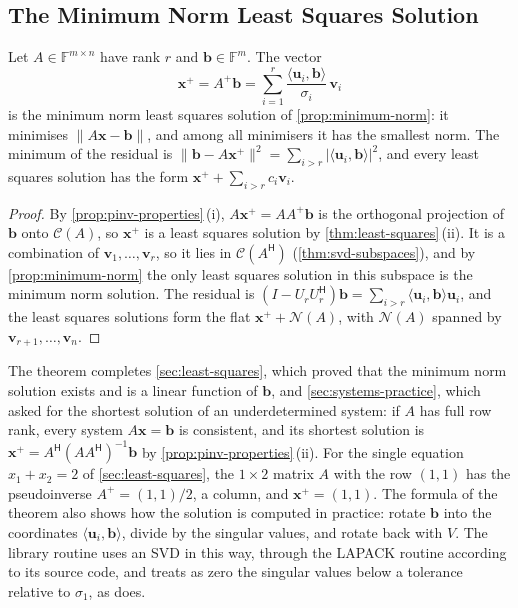 \subsection{The Minimum Norm Least Squares Solution}

\begin{theorem}
\label{thm:pinv-least-squares}
Let $A\in\mathbb F^{m\times n}$ have rank $r$ and $\mathbf b\in\mathbb F^m$. The vector
\[
\mathbf x^+=A^+\mathbf b=\sum_{i=1}^r\frac{\langle\mathbf u_i,\mathbf b\rangle}{\sigma_i}\,\mathbf v_i
\]
is the minimum norm least squares solution of \cref{prop:minimum-norm}: it minimises $\|A\mathbf x-\mathbf b\|$, and among all minimisers it has the smallest norm. The minimum of the residual is $\|\mathbf b-A\mathbf x^+\|^2=\sum_{i>r}|\langle\mathbf u_i,\mathbf b\rangle|^2$, and every least squares solution has the form $\mathbf x^++\sum_{i>r}c_i\mathbf v_i$.
\end{theorem}

\begin{proof}
By \cref{prop:pinv-properties}\,(i), $A\mathbf x^+=AA^+\mathbf b$ is the orthogonal projection of $\mathbf b$ onto $\mathcal C(A)$, so $\mathbf x^+$ is a least squares solution by \cref{thm:least-squares}\,(ii). It is a combination of $\mathbf v_1,\ldots,\mathbf v_r$, so it lies in $\mathcal C(A^{\mathsf H})$ (\cref{thm:svd-subspaces}), and by \cref{prop:minimum-norm} the only least squares solution in this subspace is the minimum norm solution. The residual is $(I-U_rU_r^{\mathsf H})\mathbf b=\sum_{i>r}\langle\mathbf u_i,\mathbf b\rangle\mathbf u_i$, and the least squares solutions form the flat $\mathbf x^++\mathcal N(A)$, with $\mathcal N(A)$ spanned by $\mathbf v_{r+1},\ldots,\mathbf v_n$.
\end{proof}

The theorem completes \cref{sec:least-squares}, which proved that the minimum norm solution exists and is a linear function of $\mathbf b$, and \cref{sec:systems-practice}, which asked for the shortest solution of an underdetermined system: if $A$ has full row rank, every system $A\mathbf x=\mathbf b$ is consistent, and its shortest solution is $\mathbf x^+=A^{\mathsf H}(AA^{\mathsf H})^{-1}\mathbf b$ by \cref{prop:pinv-properties}\,(ii). For the single equation $x_1+x_2=2$ of \cref{sec:least-squares}, the $1\times2$ matrix $A$ with the row $(1,1)$ has the pseudoinverse $A^+=(1,1)/2$, a column, and $\mathbf x^+=(1,1)$. The formula of the theorem also shows how the solution is computed in practice: rotate $\mathbf b$ into the coordinates $\langle\mathbf u_i,\mathbf b\rangle$, divide by the singular values, and rotate back with $V$. The library routine  uses an SVD in this way, through the LAPACK routine  according to its source code, and treats as zero the singular values below a tolerance relative to $\sigma_1$, as  does.

